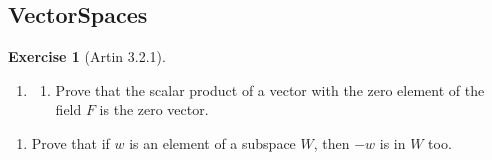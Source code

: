 \documentclass[
]{book}
\providecommand{\tightlist}{%
  \setlength{\itemsep}{0pt}\setlength{\parskip}{0pt}}
\theoremstyle{definition}
\theoremstyle{definition}
\theoremstyle{definition}
\newtheorem{exercise}{Exercise}[chapter]
\theoremstyle{definition}
\theoremstyle{remark}
\begin{document}
\hypertarget{vectorspaces}{%
\subsection{VectorSpaces}\label{vectorspaces}}

\begin{exercise}[Artin 3.2.1]
\protect\hypertarget{exr:unnamed-chunk-282}{}\label{exr:unnamed-chunk-282}\leavevmode

\begin{enumerate}
\def\labelenumi{\arabic{enumi}.}
\setcounter{enumi}{1}
\item
  \begin{enumerate}
  \def\labelenumii{(\alph{enumii})}
  \tightlist
  \item
    Prove that the scalar product of a vector with the zero element of the field \(F\) is the zero vector.
  \end{enumerate}
\end{enumerate}

\begin{enumerate}
\def\labelenumi{(\alph{enumi})}
\setcounter{enumi}{1}
\tightlist
\item
  Prove that if \(w\) is an element of a subspace \(W\), then \(-w\) is in \(W\) too.
\end{enumerate}

\end{exercise}
\end{document}
